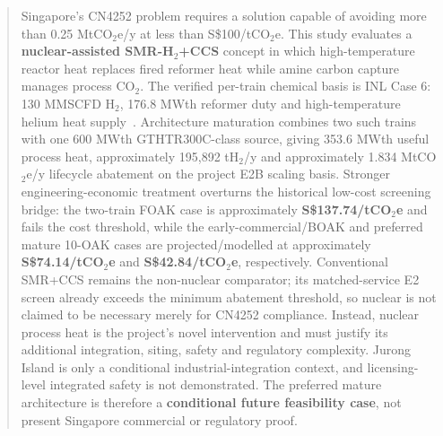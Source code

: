 \begin{abstract}
Singapore's CN4252 problem requires a solution capable of avoiding more than 0.25 MtCO$_2$e/y at less than S\$100/tCO$_2$e. This study evaluates a \textbf{nuclear-assisted SMR-H$_2$+CCS} concept in which high-temperature reactor heat replaces fired reformer heat while amine carbon capture manages process CO$_2$. The verified per-train chemical basis is INL Case 6: 130 MMSCFD H$_2$, 176.8 MWth reformer duty and high-temperature helium heat supply~\cite{inltev953,inltev961}. Architecture maturation combines two such trains with one 600 MWth GTHTR300C-class source, giving 353.6 MWth useful process heat, approximately 195,892 tH$_2$/y and approximately 1.834 MtCO$_2$e/y lifecycle abatement on the project E2B scaling basis. Stronger engineering-economic treatment overturns the historical low-cost screening bridge: the two-train FOAK case is approximately \textbf{S\$137.74/tCO$_2$e} and fails the cost threshold, while the early-commercial/BOAK and preferred mature 10-OAK cases are projected/modelled at approximately \textbf{S\$74.14/tCO$_2$e} and \textbf{S\$42.84/tCO$_2$e}, respectively. Conventional SMR+CCS remains the non-nuclear comparator; its matched-service E2 screen already exceeds the minimum abatement threshold, so nuclear is not claimed to be necessary merely for CN4252 compliance. Instead, nuclear process heat is the project's novel intervention and must justify its additional integration, siting, safety and regulatory complexity. Jurong Island is only a conditional industrial-integration context, and licensing-level integrated safety is not demonstrated. The preferred mature architecture is therefore a \textbf{conditional future feasibility case}, not present Singapore commercial or regulatory proof.
\end{abstract}
